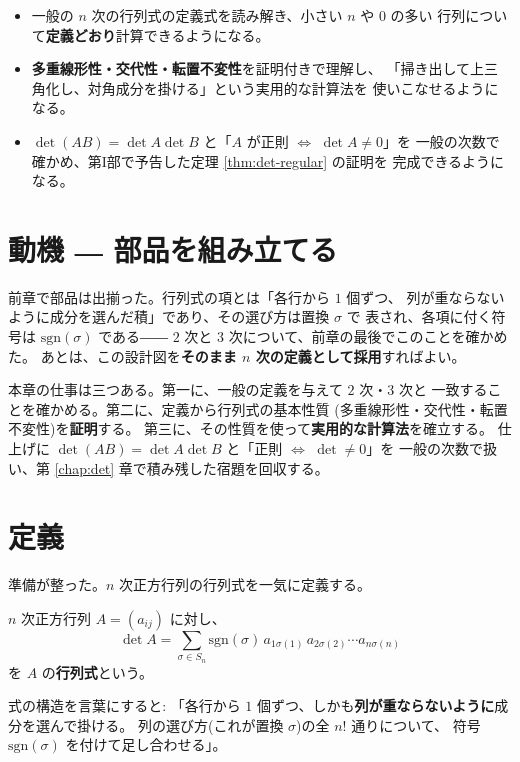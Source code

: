 \begin{goal}
\begin{itemize}
\item 一般の $n$ 次の行列式の定義式を読み解き、小さい $n$ や $0$ の多い
行列について\textbf{定義どおり}計算できるようになる。
\item \textbf{多重線形性・交代性・転置不変性}を証明付きで理解し、
「掃き出して上三角化し、対角成分を掛ける」という実用的な計算法を
使いこなせるようになる。
\item $\det(AB) = \det A \det B$ と「$A$ が正則 $\iff$ $\det A \neq 0$」を
一般の次数で確かめ、第I部で予告した定理 \ref{thm:det-regular} の証明を
完成できるようになる。
\end{itemize}
\end{goal}

\section{動機 ― 部品を組み立てる}

前章で部品は出揃った。行列式の項とは「各行から $1$ 個ずつ、
列が重ならないように成分を選んだ積」であり、その選び方は置換 $\sigma$ で
表され、各項に付く符号は $\mathrm{sgn}(\sigma)$ である――
$2$ 次と $3$ 次について、前章の最後でこのことを確かめた。
あとは、この設計図を\textbf{そのまま $n$ 次の定義として採用}すればよい。

本章の仕事は三つある。第一に、一般の定義を与えて $2$ 次・$3$ 次と
一致することを確かめる。第二に、定義から行列式の基本性質
(多重線形性・交代性・転置不変性)を\textbf{証明}する。
第三に、その性質を使って\textbf{実用的な計算法}を確立する。
仕上げに $\det(AB) = \det A \det B$ と「正則 $\iff$ $\det \neq 0$」を
一般の次数で扱い、第 \ref{chap:det} 章で積み残した宿題を回収する。

\section{定義}

準備が整った。$n$ 次正方行列の行列式を一気に定義する。

\begin{teigi}[行列式]\label{def:detn}
$n$ 次正方行列 $A = (a_{ij})$ に対し、
\[
\det A = \sum_{\sigma \in S_n} \mathrm{sgn}(\sigma)\,
a_{1\sigma(1)}\, a_{2\sigma(2)} \cdots a_{n\sigma(n)}
\]
を $A$ の\textbf{行列式}という。
\end{teigi}

式の構造を言葉にすると:
「各行から $1$ 個ずつ、しかも\textbf{列が重ならないように}成分を選んで掛ける。
列の選び方(これが置換 $\sigma$)の全 $n!$ 通りについて、
符号 $\mathrm{sgn}(\sigma)$ を付けて足し合わせる」。

